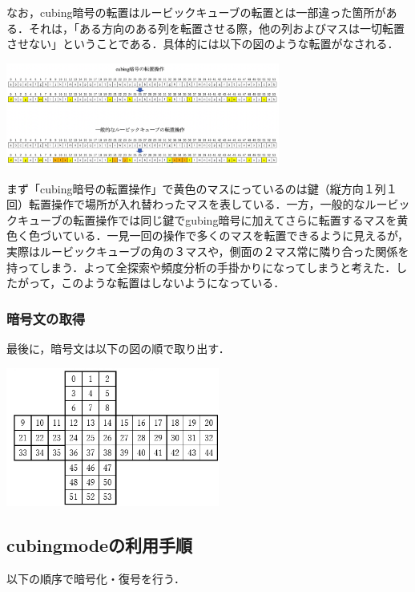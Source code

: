 \documentclass[a4p]{jarticle}
\begin{document}
なお，cubing暗号の転置はルービックキューブの転置とは一部違った箇所がある．それは，「ある方向のある列を転置させる際，他の列およびマスは一切転置させない」ということである．具体的には以下の図のような転置がなされる．\\
\begin{center}
  \includegraphics[width=9cm]{./tex_pic/trans.png}\\
\end{center}
まず「cubing暗号の転置操作」で黄色のマスにっているのは鍵（縦方向１列１回）転置操作で場所が入れ替わったマスを表している．一方，一般的なルービックキューブの転置操作では同じ鍵でgubing暗号に加えてさらに転置するマスを黄色く色づいている．一見一回の操作で多くのマスを転置できるように見えるが，実際はルービックキューブの角の３マスや，側面の２マス常に隣り合った関係を持ってしまう．よって全探索や頻度分析の手掛かりになってしまうと考えた．したがって，このような転置はしないようになっている．

\subsubsection{暗号文の取得}
最後に，暗号文は以下の図の順で取り出す．
\begin{center}
  \includegraphics[width=7cm]{./tex_pic/seq.jpg}\\
\end{center}
\subsection{cubingmodeの利用手順}

以下の順序で暗号化・復号を行う．
\end{document}
